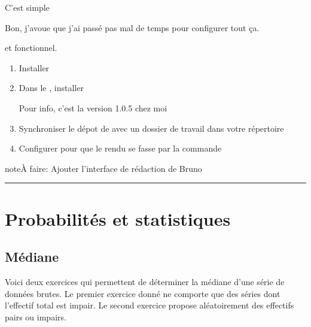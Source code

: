 \documentclass[letterpaper,10pt,french]{sphinxmanual}
\begin{document}
C’est  simple %
\begin{footnote}[1]\sphinxAtStartFootnote
Bon, j’avoue que j’ai passé pas mal de temps pour configurer tout ça.
%
\end{footnote} et fonctionnel.
\begin{enumerate}
\item {} 
Installer 

\item {} 
Dans le , installer  %
\begin{footnote}[2]\sphinxAtStartFootnote
Pour info, c’est la version 1.0.5 chez moi
%
\end{footnote}

\item {} 
Synchroniser le dépot de  avec un dossier de travail dans votre répertoire

\item {} 
Configurer  pour que le rendu se fasse par la commande 

\end{enumerate}

\begin{sphinxadmonition}{note}{\label{projet-aPropos:index-0}À faire:}
Ajouter l’interface de rédaction de Bruno
\end{sphinxadmonition}


\bigskip\hrule\bigskip



\chapter{Probabilités et statistiques}
\label{\detokenize{index:probabilites-et-statistiques}}

\section{Médiane}
\label{\detokenize{proba stat - mediane:mediane}}\label{\detokenize{proba stat - mediane::doc}}
Voici deux exercices qui permettent de déterminer la médiane d’une série
de données brutes.
Le premier exercice donné ne comporte que des séries dont l’effectif total
est impair. Le second exercice propose aléatoirement des effectifs pairs
ou impairs.

\end{document}
